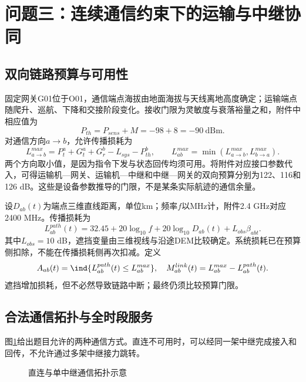 \section{问题三：连续通信约束下的运输与中继协同}
\subsection{双向链路预算与可用性}
固定网关G01位于O01，通信端点海拔由地面海拔与天线离地高度确定；运输端点随爬升、巡航、下降和交接阶段变化。接收门限为灵敏度与衰落裕量之和，附件中相应值为
\begin{equation}P_{th}=P_{sens}+M=-98+8=-90\ \mathrm{dBm}.\end{equation}
对通信方向$a\to b$，允许传播损耗为
\begin{equation}
L_{a\to b}^{max}=P_t^a+G_t^a+G_r^b-L_{sys}-P_{th}^b,\qquad
L_{ab}^{max}=\min(L_{a\to b}^{max},L_{b\to a}^{max}).
\end{equation}
两个方向取小值，是因为指令下发与状态回传均须可用。将附件对应接口参数代入，可得运输机—网关、运输机—中继和中继—网关的双向预算分别为122、116和126 dB。这些是设备参数推导的门限，不是某条实际航迹的通信余量。

设$D_{ab}(t)$为端点三维直线距离，单位km；频率$f$以MHz计，附件2.4 GHz对应2400 MHz。传播损耗为
\begin{equation}
L_{ab}^{path}(t)=32.45+20\log_{10}f+20\log_{10}D_{ab}(t)+L_{obs}\beta_{abt}.
\end{equation}
其中$L_{obs}=10$ dB，遮挡变量由三维视线与沿途DEM比较确定。系统损耗已在预算侧扣除，不能在传播损耗侧再次扣减。定义
\begin{equation}
A_{ab}(t)=\ind\{L_{ab}^{path}(t)\le L_{ab}^{max}\},\quad
M_{ab}^{link}(t)=L_{ab}^{max}-L_{ab}^{path}(t).
\end{equation}
遮挡增加损耗，但不必然导致链路中断；最终仍须比较预算门限。

\subsection{合法通信拓扑与全时段服务}
图\ref{fig:q3-topology}给出题目允许的两种通信方式。直连不可用时，可以经同一架中继完成接入和回传，不允许通过多架中继接力跳转。
\begin{figure}[htbp]\centering
{}
\caption{直连与单中继通信拓扑示意}\label{fig:q3-topology}
\end{figure}

